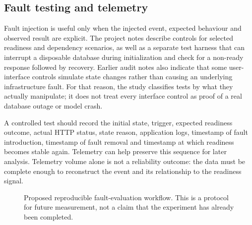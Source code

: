 \documentclass[11pt,a4paper]{article}
\begin{document}
\subsection{Fault testing and telemetry}

Fault injection is useful only when the injected event, expected behaviour and observed result are explicit. The project notes describe controls for selected readiness and dependency scenarios, as well as a separate test harness that can interrupt a disposable database during initialization and check for a non-ready response followed by recovery. Earlier audit notes also indicate that some user-interface controls simulate state changes rather than causing an underlying infrastructure fault. For that reason, the study classifies tests by what they actually manipulate; it does not treat every interface control as proof of a real database outage or model crash.

A controlled test should record the initial state, trigger, expected readiness outcome, actual HTTP status, state reason, application logs, timestamp of fault introduction, timestamp of fault removal and timestamp at which readiness becomes stable again. Telemetry can help preserve this sequence for later analysis. Telemetry volume alone is not a reliability outcome: the data must be complete enough to reconstruct the event and its relationship to the readiness signal.

\begin{figure}[H]
\centering
{}
\caption{Proposed reproducible fault-evaluation workflow. This is a protocol for future measurement, not a claim that the experiment has already been completed.}
\label{fig:experiment}
\end{figure}
\end{document}
